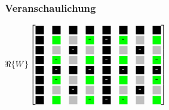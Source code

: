 \begin{frame}[t]\frametitle{Veranschaulichung}

\begin{minipage}{0.55\textwidth}
\begingroup
 \renewcommand*{\arraystretch}{0.8} %
   $\Re\{W\}
    \begin{bmatrix}
     \myboxOnePos 	& \myboxOnePos 		& \myboxOnePos 	& \myboxOnePos 		& \myboxOnePos 	& \myboxOnePos 		& \myboxOnePos 	& \myboxOnePos \\
     \myboxOnePos 	& \myboxSqrtPos 	& \myboxZero 	& \myboxSqrtNeg		& \myboxOneNeg	& \myboxSqrtNeg		& \myboxZero	& \myboxSqrtPos \\
     \myboxOnePos 	& \myboxZero 		& \myboxOneNeg 	& \myboxZero 		& \myboxOnePos 	& \myboxZero 		& \myboxOneNeg 	& \myboxZero \\
     \myboxOnePos 	& \myboxSqrtNeg 	& \myboxZero 	& \myboxSqrtPos 	& \myboxOneNeg 	& \myboxSqrtPos 	& \myboxZero 	& \myboxSqrtNeg \\
     \myboxOnePos 	& \myboxOneNeg 		& \myboxOnePos 	& \myboxOneNeg 		& \myboxOnePos 	& \myboxOneNeg 		& \myboxOnePos 	& \myboxOneNeg \\
     \myboxOnePos 	& \myboxSqrtNeg 	& \myboxZero 	& \myboxSqrtPos 	& \myboxOneNeg 	& \myboxSqrtPos 	& \myboxZero 	& \myboxSqrtNeg \\
     \myboxOnePos 	& \myboxZero 		& \myboxOneNeg 	& \myboxZero 		& \myboxOnePos 	& \myboxZero 		& \myboxOneNeg 	& \myboxZero \\
     \myboxOnePos 	& \myboxSqrtPos 	& \myboxZero 	& \myboxSqrtNeg		& \myboxOneNeg	& \myboxSqrtNeg		& \myboxZero	& \myboxSqrtPos 
    \end{bmatrix}
   $
   

\end{minipage}
\end{frame}
